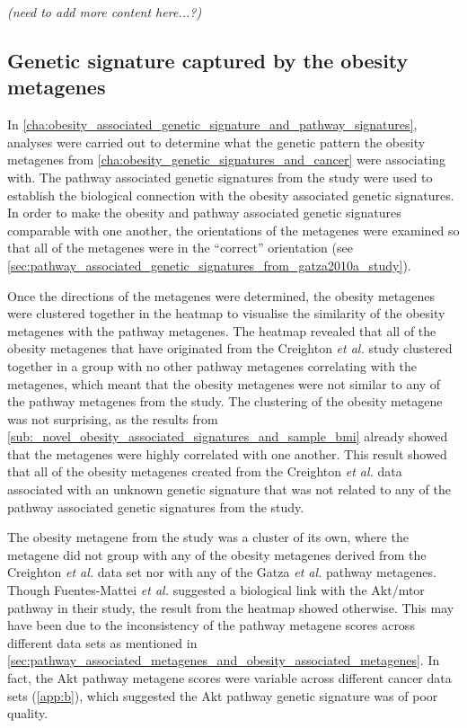 \textit{(need to add more content here...?)}

\subsection{Genetic signature captured by the obesity metagenes}
\label{sub:genetic_signature_captured_by_the_obesity_metagenes}

In \cref{cha:obesity_associated_genetic_signature_and_pathway_signatures}, analyses were carried out to determine what the genetic pattern the obesity metagenes from \cref{cha:obesity_genetic_signatures_and_cancer} were associating with.
The pathway associated genetic signatures from the \citet{Gatza2010a} study were used to establish the biological connection with the obesity associated genetic signatures.
In order to make the obesity and pathway associated genetic signatures comparable with one another, the orientations of the metagenes were examined so that all of the metagenes were in the ``correct'' orientation (see \cref{sec:pathway_associated_genetic_signatures_from_gatza2010a_study}).

Once the directions of the metagenes were determined, the obesity metagenes were clustered together in the heatmap to visualise the similarity of the obesity metagenes with the pathway metagenes.
The heatmap revealed that all of the obesity metagenes that have originated from the Creighton \textit{et al.} study clustered together in a group with no other pathway metagenes correlating with the metagenes, which meant that the obesity metagenes were not similar to any of the pathway metagenes from the \citet{Gatza2010a} study.
The clustering of the obesity metagene was not surprising, as the results from \cref{sub:_novel_obesity_associated_signatures_and_sample_bmi} already showed that the metagenes were highly correlated with one another.
This result showed that all of the obesity metagenes created from the Creighton \textit{et al.} data associated with an unknown genetic signature that was not related to any of the pathway associated genetic signatures from the \citet{Gatza2010a} study.

The obesity metagene from the \citet{Fuentes-Mattei2014} study was a cluster of its own, where the metagene did not group with any of the obesity metagenes derived from the Creighton \textit{et al.} data set nor with any of the Gatza \textit{et al.} pathway metagenes.
Though Fuentes-Mattei \textit{et al.} suggested a biological link with the Akt/\gls{mtor} pathway in their study, the result from the heatmap showed otherwise.
This may have been due to the inconsistency of the pathway metagene scores across different data sets as mentioned in \cref{sec:pathway_associated_metagenes_and_obesity_associated_metagenes}.
In fact, the Akt pathway metagene scores were variable across different cancer data sets (\cref{app:b}), which suggested the Akt pathway genetic signature was of poor quality.

